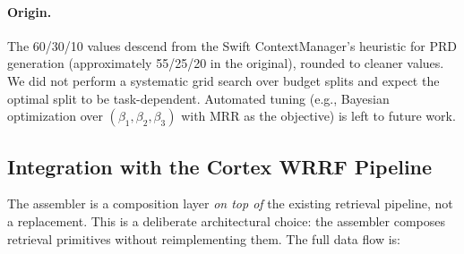 \documentclass[11pt]{article}
\newcommand{\eg}{e.g.}
\begin{document}
\paragraph{Origin.}
The 60/30/10 values descend from the Swift ContextManager's heuristic
for PRD generation (approximately 55/25/20 in the original), rounded
to cleaner values.  We did not perform a systematic grid search over
budget splits and expect the optimal split to be task-dependent.
Automated tuning (\eg, Bayesian optimization over
$(\beta_1, \beta_2, \beta_3)$ with MRR as the objective) is left to
future work.

\subsection{Integration with the Cortex WRRF Pipeline}
\label{sec:integration}

The assembler is a composition layer \emph{on top of} the existing
retrieval pipeline, not a replacement.  This is a deliberate
architectural choice: the assembler composes retrieval primitives
without reimplementing them.  The full data flow is:
\end{document}
